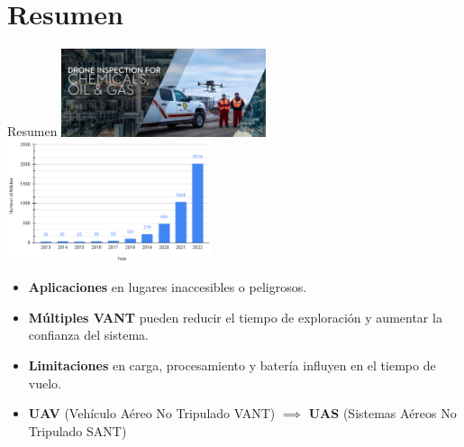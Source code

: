 \documentclass[
  24pt, %
  aspectratio=169, %
]{beamer}
\begin{document}
\section{Resumen}
\begin{frame}{Resumen}
  \bigskip %
  \centering
  \includegraphics[width=0.45\textwidth,height=0.35\textheight]{DJI_B4}
  \hfil
  \includegraphics[width=0.45\textwidth,height=0.35\textheight]{drones-07-00236-g001.png}\footnotemark
  \vspace{2pt}\\
  
  \begin{itemize}
  \item \textbf{Aplicaciones} en lugares inaccesibles o peligrosos.
  \item \textbf{Múltiples VANT} pueden reducir el tiempo de exploración y aumentar la confianza del sistema.
  \item \textbf{Limitaciones} en carga, procesamiento y batería influyen en el tiempo de vuelo.
  \item \textbf{UAV} {\tiny(Vehículo Aéreo No Tripulado VANT)}  $\implies$ \textbf{UAS} {\tiny(Sistemas Aéreos No Tripulado SANT)}
  \end{itemize}
  
\end{frame}
\end{document}
